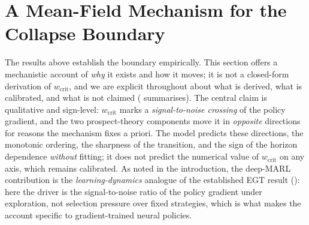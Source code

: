 \documentclass[letterpaper]{article}
\theoremstyle{plain}
\newcommand{\wcrit}{w_{\mathrm{crit}}}
\begin{document}
\section{A Mean-Field Mechanism for the Collapse Boundary}
\label{sec:meanfield}

The results above establish the boundary empirically. This section offers a
mechanistic account of \emph{why} it exists and how it moves; it is not a
closed-form derivation of $\wcrit$, and we are explicit throughout about
what is derived, what is calibrated, and what is not claimed
( summarises). The central claim is qualitative and
sign-level: $\wcrit$ marks a \emph{signal-to-noise crossing} of the policy
gradient, and the two prospect-theory components move it in \emph{opposite}
directions for reasons the mechanism fixes a priori. The model predicts
these directions, the monotonic ordering, the sharpness of the transition,
and the sign of the horizon dependence \emph{without} fitting; it does not
predict the numerical value of $\wcrit$ on any axis, which remains
calibrated. As noted in the introduction, the deep-MARL contribution is the
\emph{learning-dynamics} analogue of the established EGT result
(\citealp{mengesha2025}): here the driver is the signal-to-noise ratio of the
policy gradient under exploration, not selection pressure over fixed strategies,
which is what makes the account specific to gradient-trained neural policies.
\end{document}
